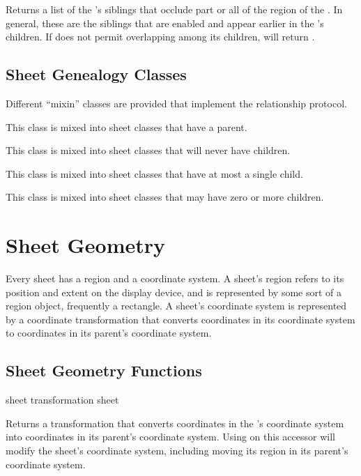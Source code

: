 Returns a list of the  's siblings that occlude part or
all of the region of the .  In general, these are the siblings that
are enabled and appear earlier in the  's children.  If
 does not permit overlapping among its children,
 will return .

\FreshOutputs


\subsection {Sheet Genealogy Classes}

Different ``mixin'' classes are provided that implement the relationship protocol.


This class is mixed into sheet classes that have a parent.


This class is mixed into sheet classes that will never have children.


This class is mixed into sheet classes that have at most a single child.


This class is mixed into sheet classes that may have zero or more children.


\section {Sheet Geometry}

Every sheet has a region and a coordinate system.  A sheet's region refers to
its position and extent on the display device, and is represented by some sort
of a region object, frequently a rectangle.  A sheet's coordinate system is
represented by a coordinate transformation that converts coordinates in its
coordinate system to coordinates in its parent's coordinate system.

\subsection {Sheet Geometry Functions}

 {sheet}
 {transformation sheet}

Returns a transformation that converts coordinates in the 
's coordinate system into coordinates in its parent's coordinate
system.  Using  on this accessor will modify the sheet's coordinate
system, including moving its region in its parent's coordinate system.

